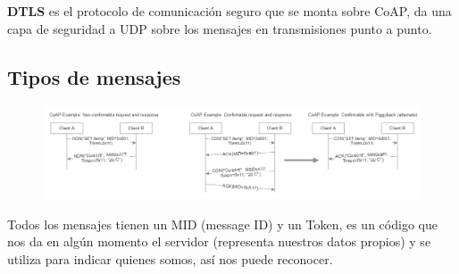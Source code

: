 \documentclass[12pt]{report} %
\begin{document}
\textbf{DTLS} es el protocolo de comunicación seguro que se monta sobre CoAP, da una capa de seguridad a UDP sobre los mensajes en transmisiones punto a punto.

\subsection{Tipos de mensajes}
\begin{figure}[H]
	{\includegraphics[scale=.48]{d5c42d4c-400c-4d55-9eea-96fc5bedf353.png}}
\end{figure}

Todos los mensajes tienen un MID (message ID) y un Token, es un código que nos da en algún momento el servidor (representa nuestros datos propios) y se utiliza para indicar quienes somos, así nos puede reconocer.
\end{document}
